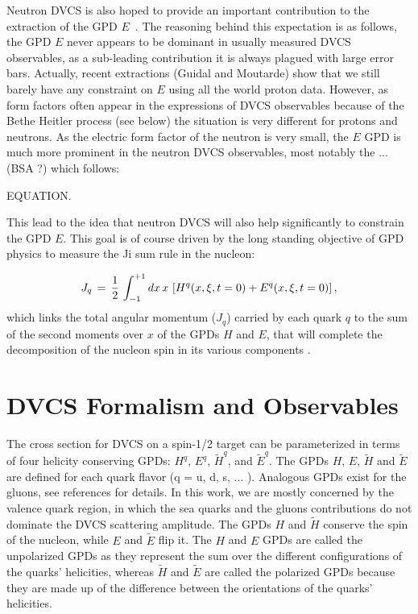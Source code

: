 Neutron DVCS is also hoped to provide an important contribution to the 
extraction of the GPD $E$~\cite{}. The reasoning behind this expectation is as 
follows, the GPD $E$ never appears to be dominant in usually measured DVCS 
observables, as a sub-leading contribution it is always plagued with large 
error bars. Actually, recent extractions \cite{} (Guidal and Moutarde) show 
that we still barely have any constraint on $E$ using all the world proton 
data.  However, as form factors often appear in the expressions of
DVCS observables because of the Bethe Heitler process (see below) the situation 
is very different for protons and neutrons. As the electric form factor of the 
neutron is very small, the $E$ GPD is much more prominent in the neutron DVCS 
observables, most notably the ... (BSA ?) which follows:

EQUATION.

This lead to the idea that neutron DVCS will also help significantly to constrain the 
GPD $E$. This goal is of course driven by the long standing objective of GPD physics to
measure the Ji sum rule in the nucleon:

\begin{equation}
J_q \,=\, {1 \over 2} \, \int_{-1}^{+1} d x \, x \, 
\left[ H^{q}(x,\xi,t = 0) + E^{q}(x,\xi,t = 0) \right],
\label{eq:dvcs_spin}
\end{equation}
which links the total angular momentum ($J_q$) carried by each quark $q$ to the 
sum of the second moments over $x$ of the GPDs $H$ and $E$, that will complete 
the decomposition of the nucleon spin in its various components 
\cite{PhysRevLett.78.610}. 

\section{DVCS Formalism and Observables}

The cross section for DVCS on a spin-1/2 target can be parameterized in terms 
of four helicity conserving GPDs: $H^q$, $E^q$, $\tilde{H}^q$, and 
$\tilde{E}^q$. The GPDs $H$, $E$, $\widetilde{H}$ and $\widetilde{E}$ are 
defined for each quark flavor (q = u, d, s, ... ). Analogous GPDs exist for the 
gluons, see references \cite{PhysRevLett.78.610,PhysRevD.56.5524,Goeke:2001tz} for details.  In 
this work, we are mostly concerned by the valence quark region, in which the 
sea quarks and the gluons contributions do not dominate the DVCS scattering 
amplitude. The GPDs $H$ and $\widetilde{H}$ conserve the spin of the nucleon, 
while $E$ and $\widetilde{E}$ flip it. The $H$ and $E$ GPDs are called the 
unpolarized GPDs as they represent the sum over the different configurations of 
the quarks' helicities, whereas $\widetilde{H}$ and $\widetilde{E}$ are called 
the polarized GPDs because they are made up of the difference between the 
orientations of the quarks' helicities.

